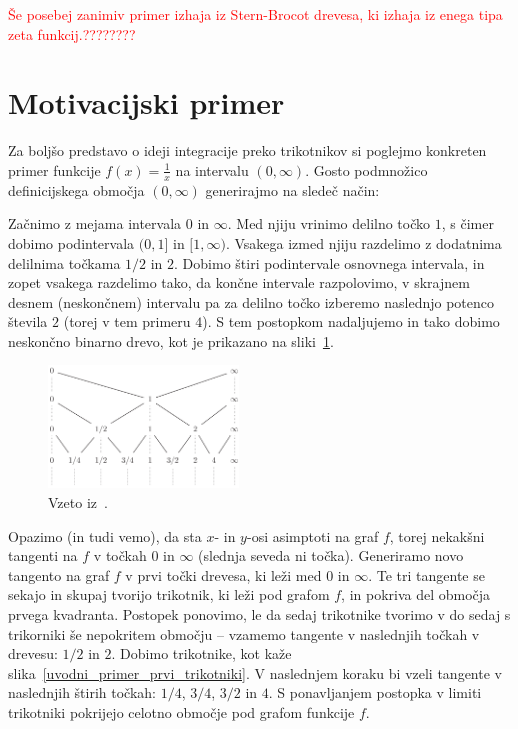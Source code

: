 \documentclass[a4paper, 12pt, titlepage]{article}
\begin{document}
\textcolor{red}{Še posebej zanimiv primer izhaja iz Stern-Brocot drevesa, ki izhaja iz enega tipa zeta funkcij.????????}


\newpage
\section{Motivacijski primer}

Za boljšo predstavo o ideji integracije preko trikotnikov si poglejmo konkreten primer funkcije $ f(x) = \frac{1}{x} $ na intervalu $ (0, \infty) $. Gosto podmnožico definicijskega območja $ (0, \infty) $ generirajmo na sledeč način:

Začnimo z mejama intervala $ 0 $ in $ \infty $. Med njiju vrinimo delilno točko $ 1 $, s čimer dobimo podintervala $ (0, 1] $ in $ [1, \infty) $. Vsakega izmed njiju razdelimo z dodatnima delilnima točkama $ 1/2 $ in $ 2 $. Dobimo štiri podintervale osnovnega intervala, in zopet vsakega razdelimo tako, da končne intervale razpolovimo, v skrajnem desnem (neskončnem) intervalu pa za delilno točko izberemo naslednjo potenco števila $ 2 $ (torej v tem primeru $ 4 $). S tem postopkom nadaljujemo in tako dobimo neskončno binarno drevo, kot je prikazano na sliki~\ref{uvodni_primer_drevo}.

\begin{figure}[h]
    \centering
    \includegraphics[width=0.45\textwidth]{slike/uvodni_primer_drevo.png}
    \caption{Vzeto iz~\cite{osnovni_clanek}.}
    \label{uvodni_primer_drevo}
\end{figure}

Opazimo (in tudi vemo), da sta $ x $- in $ y $-osi asimptoti na graf $ f $, torej nekakšni tangenti na $ f $ v točkah $ 0 $ in $ \infty $ (slednja seveda ni točka). Generiramo novo tangento na graf $ f $ v prvi točki drevesa, ki leži med $ 0 $ in $ \infty $. Te tri tangente se sekajo in skupaj tvorijo trikotnik, ki leži pod grafom $ f $, in pokriva del območja prvega kvadranta. Postopek ponovimo, le da sedaj trikotnike tvorimo v do sedaj s trikorniki še nepokritem območju -- vzamemo tangente v naslednjih točkah v drevesu: $ 1/2 $ in $ 2 $. Dobimo trikotnike, kot kaže slika~\ref{uvodni_primer_prvi_trikotniki}. V naslednjem koraku bi vzeli tangente v naslednjih štirih točkah: $ 1/4 $, $ 3/4 $, $ 3/2 $ in $ 4 $. S ponavljanjem postopka v limiti trikotniki pokrijejo celotno območje pod grafom funkcije $ f $.
\end{document}
